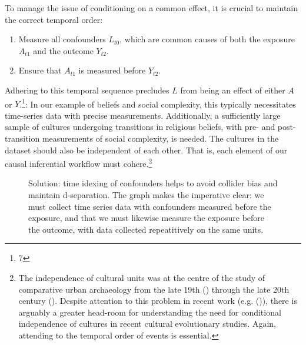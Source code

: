 \documentclass[
  singlecolumn,
  9pt]{article}
\providecommand{\tightlist}{%
  \setlength{\itemsep}{0pt}\setlength{\parskip}{0pt}}\usepackage{longtable,booktabs,array}
\begin{document}
To manage the issue of conditioning on a common effect, it is crucial to
maintain the correct temporal order:

\begin{enumerate}
\def\labelenumi{\arabic{enumi}.}
\tightlist
\item
  Measure all confounders \(L_{t0}\), which are common causes of both
  the exposure \(A_{t1}\) and the outcome \(Y_{t2}\).
\item
  Ensure that \(A_{t1}\) is measured before \(Y_{t2}\).
\end{enumerate}

Adhering to this temporal sequence precludes \(L\) from being an effect
of either \(A\) or \(Y\).\footnote{7}: In our example of beliefs and
social complexity, this typically necessitates time-series data with
precise measurements. Additionally, a sufficiently large sample of
cultures undergoing transitions in religious beliefs, with pre- and
post-transition measurements of social complexity, is needed. The
cultures in the dataset should also be independent of each other. That
is, each element of our causal inferential workflow must
cohere.\footnote{The independence of cultural units was at the centre of
  the study of comparative urban archaeology from the late 19th
  () through the late
  20th century (). Despite
  attention to this problem in recent work (e.g.
  ()), there is
  arguably a greater head-room for understanding the need for
  conditional independence of cultures in recent cultural evolutionary
  studies. Again, attending to the temporal order of events is
  essential.}

\begin{figure}


\caption{\label{fig-dag-common-effect-solution}Solution: time idexing of
confounders helps to avoid collider bias and maintain d-separation. The
graph makes the imperative clear: we must collect time series data with
confounders measured before the exposure, and that we must likewise
measure the exposure before the outcome, with data collected
repeatitively on the same units.}

\end{figure}%
\end{document}
